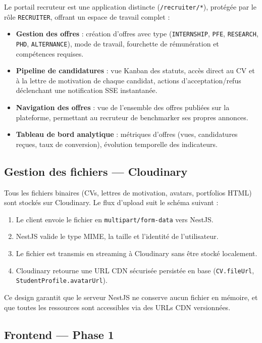 ﻿\documentclass[12pt,a4paper]{report}
\begin{document}
Le portail recruteur est une application distincte (\texttt{/recruiter/*}), protégée par le rôle \texttt{RECRUITER}, offrant un espace de travail complet :

\begin{itemize}
  \item \textbf{Gestion des offres} : création d'offres avec type (\texttt{INTERNSHIP}, \texttt{PFE}, \texttt{RESEARCH}, \texttt{PHD}, \texttt{ALTERNANCE}), mode de travail, fourchette de rémunération et compétences requises.
  \item \textbf{Pipeline de candidatures} : vue Kanban des statuts, accès direct au CV et à la lettre de motivation de chaque candidat, actions d'acceptation/refus déclenchant une notification SSE instantanée.
  \item \textbf{Navigation des offres} : vue de l'ensemble des offres publiées sur la plateforme, permettant au recruteur de benchmarker ses propres annonces.
  \item \textbf{Tableau de bord analytique} : métriques d'offres (vues, candidatures reçues, taux de conversion), évolution temporelle des indicateurs.
\end{itemize}

\subsection{Gestion des fichiers — Cloudinary}

Tous les fichiers binaires (CVs, lettres de motivation, avatars, portfolios HTML) sont stockés sur Cloudinary. Le flux d'upload suit le schéma suivant :

\begin{enumerate}
  \item Le client envoie le fichier en \texttt{multipart/form-data} vers NestJS.
  \item NestJS valide le type MIME, la taille et l'identité de l'utilisateur.
  \item Le fichier est transmis en streaming à Cloudinary sans être stocké localement.
  \item Cloudinary retourne une URL CDN sécurisée persistée en base (\texttt{CV.fileUrl}, \texttt{StudentProfile.avatarUrl}).
\end{enumerate}

Ce design garantit que le serveur NestJS ne conserve aucun fichier en mémoire, et que toutes les ressources sont accessibles via des URLs CDN versionnées.

\subsection{Frontend — Phase 1}
\end{document}
